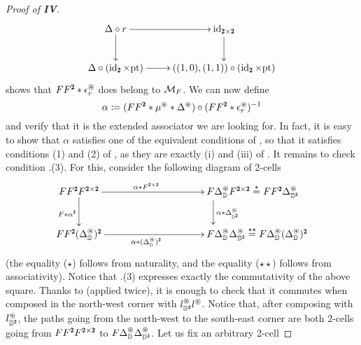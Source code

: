 \begin{proof}[Proof of \athm\textbf{IV}]
\[
\xymatrix{
\Delta\circ r\ar[r]\ar[d]&\id_{\due\times \due}\ar[d]\\
\Delta\circ (\id_\due\times \pt)\ar[r]&((1,0),(1,1))\circ(\id_\due\times \pt)}
\]
shows that $FF^\due * \epsilon_r^{\circledast}$ does belong to $\mathcal{M}_F$. We can now define 
\[
\alpha  \coloneqq  (FF^\due * \mu^\circledast*\Delta^\circledast) \circ (FF^\due * \epsilon^\circledast_r)^{-1}
\] 
and verify that it is the extended associator we are looking for. 
In fact, it is  easy to show that $\alpha$ satisfies one of the equivalent conditions of , so that it satisfies conditions (1) and (2) of , as they are exactly (i) and (iii) of .  
%
%
It remains to check condition .(3). %
For this, consider the following diagram of 2-cells
\begin{equation}\label{diff_coh_dia}
\xymatrix@C=2cm{
\ar[d]_{F*\alpha^\due} \ar[r]^{\alpha * F^{\due\times\due}}FF^\due F^{\due\times\due} & **[r] F\Delta^\circledast_\D F^{\due\times\due} \overset{\star}= FF^\due \Delta^\circledast_{\D^\due} \ar[d]^{\alpha  * \Delta^\circledast_{\D^\due}}\\
FF^\due (\Delta^\circledast_\D)^\due \ar[r]_{\alpha * (\Delta^\circledast_\D)^\due} & **[r] F\Delta^\circledast_\D \Delta^\circledast_{\D^\due} \overset{\star\star}= F\Delta^\circledast_\D(\Delta^\circledast_\D)^\due
}
\end{equation}
(the equality ($\star$) follows from naturality, and the equality ($\star\star$) follows from associativity). Notice that .(3) expresses exactly the commutativity of the above square. Thanks to  (applied twice), it is enough to check that it commutes when composed in the north\hyp{}west corner with $l_{\D^\due}^{\circledast}l^{\circledast}$. Notice that, after composing with $l_{\D^\due}^{\circledast}$, the paths going from the north\hyp{}west to the south\hyp{}east corner are both 2-cells going from $FF^\due F^{\due\times \due}$ to $F\Delta_\D^\circledast \Delta^\circledast_{\D^\due}$. Let us fix an arbitrary 2-cell 

\end{proof}
